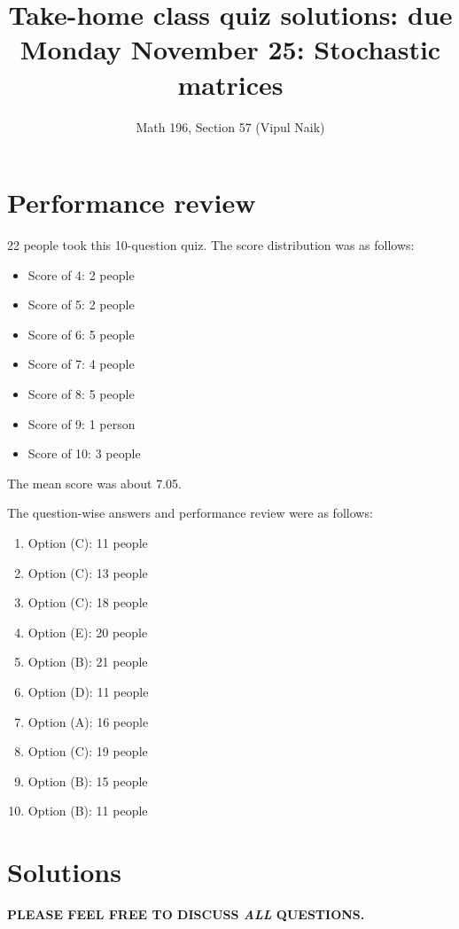 \documentclass[10pt]{amsart}
\title{Take-home class quiz solutions: due Monday November 25: Stochastic matrices}
\author{Math 196, Section 57 (Vipul Naik)}
\begin{document}
\maketitle

\section{Performance review}

22 people took this 10-question quiz. The score distribution was as follows:

\begin{itemize}
\item Score of 4: 2 people
\item Score of 5: 2 people
\item Score of 6: 5 people
\item Score of 7: 4 people
\item Score of 8: 5 people
\item Score of 9: 1 person
\item Score of 10: 3 people
\end{itemize}

The mean score was about 7.05.

The question-wise answers and performance review were as follows:

\begin{enumerate}
\item Option (C): 11 people%
\item Option (C): 13 people%
\item Option (C): 18 people%
\item Option (E): 20 people%
\item Option (B): 21 people%
\item Option (D): 11 people%
\item Option (A): 16 people%
\item Option (C): 19 people%
\item Option (B): 15 people%
\item Option (B): 11 people%
\end{enumerate}

\section{Solutions}

{\bf PLEASE FEEL FREE TO DISCUSS {\em ALL} QUESTIONS.}
\end{document}
